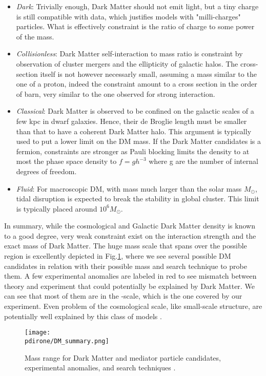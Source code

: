 \begin{itemize}
\item \textit{Dark}: Trivially enough, Dark Matter should not emit light, but a tiny charge is still compatible with data, which justifies models with "milli-charges" particles. What is effectively constraint is the ratio of charge to some power of the mass.
\item \textit{Collisionless}: Dark Matter self-interaction to mass ratio is constraint by observation of cluster mergers and the ellipticity of galactic halos. The cross-section itself is not however necessarly small, assuming a mass similar to the one of a proton, indeed the constraint amount to a cross section in the order of barn, very similar to the one observed for strong interaction.
\item \textit{Classical}: Dark Matter is observed to be confined on the galactic scales of a few kpc in dwarf galaxies. Hence, their de Broglie length must be smaller than that to have a coherent Dark Matter halo. This argument is typically used to put a lower limit on the DM mass. If the Dark Matter candidates is a fermion, constraints are stronger as Pauli blocking limits the density to at most the phase space density to $f=gh^{-3}$ where g are the number of internal degrees of freedom.
\item \textit{Fluid}: For macroscopic DM, with mass much larger than the solar mass $M_{\odot}$, tidal disruption is expected to break the stability  in global cluster. This limit is typically placed around $10^6 M_{\odot}$.
\end{itemize}

In summary, while the cosmological and Galactic Dark Matter density is known to a good degree, very weak constraint exist on the interaction strength and the exact mass of Dark Matter. The huge mass scale that spans over the possible region is excellently depicted in Fig.\ref{fig:dm-mass-range}, where we see several possible DM candidates in relation with their possible mass and search technique to probe them. A few experimental anomalies are labeled in red to see mismatch between theory and experiment that could potentially be explained by Dark Matter. We can see that most of them are in the \mev-\gev scale, which is the one covered by our experiment. Even problem of the cosmological scale, like small-scale structure, are potentially well explained by this class of models \cite{battaglieri2017cosmic}.

\begin{figure}[bht!]
  \centering
  \texttt{[image: \\pdirone/DM\_summary.png]}
  \caption[Mass range for Dark Matter]{Mass range for Dark Matter and mediator particle candidates, experimental anomalies, and search techniques \cite{battaglieri2017cosmic}.}
  \label{fig:dm-mass-range}
\end{figure}


